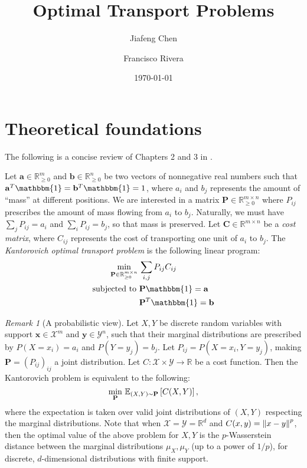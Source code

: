 \documentclass[11pt]{amsart}
\title{Optimal Transport Problems}
\author{Jiafeng Chen\and Francisco Rivera}
\date{\today}
\newcommand{\R}{\mathbb{R}}
\newcommand{\one}{\mathbbm{1}}
\newcommand{\E}{\mathbb{E}}
\renewcommand{\b}{\mathbf}
\theoremstyle{remark}
\newtheorem{rmk}{Remark}
\begin{document}
    \maketitle
    \section{Theoretical foundations}
    The following is a concise review of Chapters 2 and 3 in 
    \cite{peyre2017computational}.
    
    Let $\b a \in \R^m_{\ge 0}$ and $\b b \in \R^n_{\ge 0}$ be two vectors of
    nonnegative real numbers such that $\b a^T \one = \b b^T \one = 1$, where
    $a_i$ and $b_j$ represents the amount of ``mass'' at different positions. 
    We are
    interested in a matrix $\b P \in \R^{m \times n}_{\ge 0}$ where $P_{ij}$
    prescribes
    the amount of mass flowing from $a_i$ to $b_j$. Naturally, we must have
    $\sum_j P_{ij} = a_i$ and $\sum_i P_{ij} = b_j$, so that mass is preserved.
    Let $\b C
    \in \R^{m\times n}$ be a \emph{cost matrix}, where $C_{ij}$ represents the
    cost of transporting one unit of $a_i$ to $b_j$. The \emph{Kantorovich
    optimal transport problem} is the following linear program: \begin{align*}
    \min_{\b P \in  \R^{m \times n}_{\ge 0}} \, & \sum_{i,j} P_{ij} C_{ij} \\
    \text{subjected to } & \b P \one = \b a \\
    & \b P^T \one = \b b
    \end{align*}
    
    \begin{rmk}[A probabilistic view]
    Let $X,Y$ be discrete random variables with support $\b
    x \in \mathcal X^m$ and $\b y \in \mathcal Y^n$, such that their marginal
    distributions are
    prescribed by $P(X = x_i) = a_i$ and $P(Y =
    y_j) = b_j$. Let $P_{ij} = P(X = x_i, Y = y_j)$, making $\b P = (P_{ij})_
    {ij}$ a joint
    distribution. Let $C: \mathcal X \times \mathcal Y \to \R$ be a cost
    function. Then the
    Kantorovich problem is equivalent to the following:\[
    \min_{\b P}\, \E_{(X,Y) \sim \b P}\bk{C(X,Y)},
    \]
    where the expectation is taken over valid joint distributions of $(X,Y)$
    respecting the marginal distributions. Note that when $\mathcal X = \mathcal
    Y = \R^d$ and $C(x,y) = \left\lVert x-y\right\rVert^p$, then the optimal value of the above
    problem for $X,Y$ is the $p$-Wasserstein distance between the marginal
    distributions $\mu_X,\mu_Y$ (up to a power of $1/p$), for discrete,
    $d$-dimensional distributions with finite support.
    \end{rmk}
    
\end{document}
